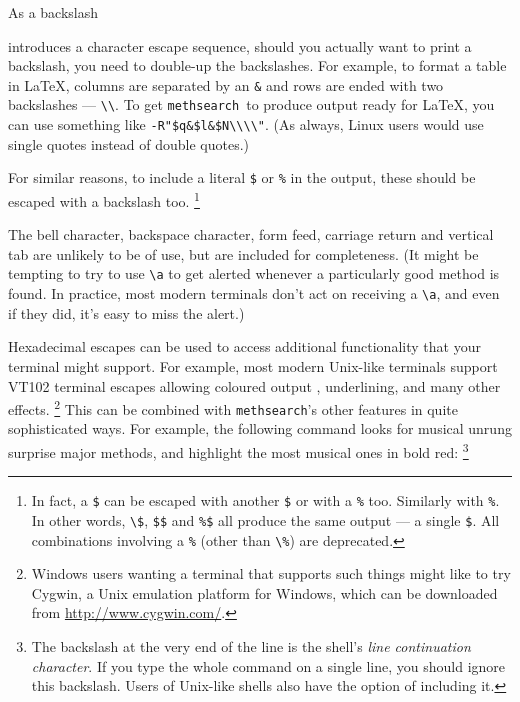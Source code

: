 \documentclass[a4paper,11pt,oneside]{book}
\makeatletter
\newcommand{\symidx}[2]{} %
\def\methsearch{\texttt{meth\-search}}
\makeatother
\begin{document}
As a backslash%
\symidx{\textbackslash}{character escape sequence} 
introduces a character escape sequence, 
should you actually want to print a backslash, you need to double-up the 
backslashes.  For example, to format a table in \LaTeX{}, 
columns are separated by an \verb+&+ and rows are ended with two backslashes 
--- \verb+\\+.  
To get \methsearch\ to produce output ready for \LaTeX, you can use
something like \verb+-R"$q&$l&$N\\\\"+.  (As always, Linux users would use
single quotes instead of double quotes.)

For similar reasons, to include a literal \verb+$+ or \verb+%+ in the 
output, these should be escaped with a backslash too.%
\footnote{In fact, a \verb+$+ can be escaped with another \verb+$+ or 
with a \verb+%+ too.  Similarly with \verb+%+.  In other words, \verb+\$+,
\verb+$$+ and \verb+%$+ all produce the same output --- a single \verb+$+.
All combinations involving a \verb+%+ (other than \verb+\%+) are deprecated.}

The bell character, backspace character, 
form feed, carriage return and vertical tab are unlikely to be
of use, but are included for completeness.  (It might be tempting to try to 
use \verb+\a+ to get alerted whenever a particularly good method is found.
In practice, most modern terminals don't act on receiving a \verb+\a+, and
even if they did, it's easy to miss the alert.)

Hexadecimal escapes can be used to access additional functionality that
your terminal might support.  For example, most modern Unix-like terminals
support VT102 terminal escapes allowing coloured output%
, underlining, and many other effects.%
\footnote{Windows users wanting a terminal that supports such things
might like to try Cygwin, a Unix emulation platform for Windows, 
which can be downloaded from \url{http://www.cygwin.com/}.}
This can be combined with \methsearch's other features in quite sophisticated
ways.  For example, the following command looks for musical unrung 
surprise major methods, and highlight the most musical ones in bold red:%
%
\footnote{The backslash at the very end of the line is the shell's 
\textit{line continuation character}.  If you 
type the whole command on a single line, you should ignore this backslash.
Users of Unix-like shells also have the option of including it.}
\end{document}
